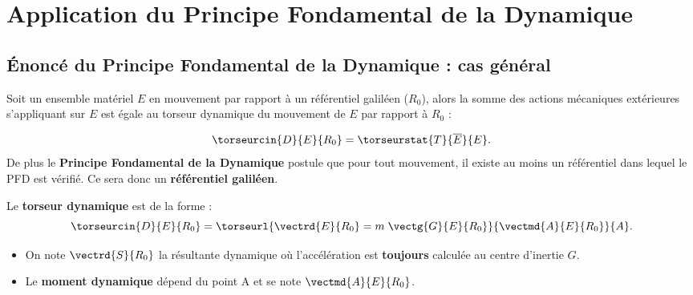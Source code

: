 \setchapterpreamble[u]{\margintoc}

\chapter{Application du Principe Fondamental de la Dynamique}



%




\section{Énoncé du Principe Fondamental de la Dynamique : cas général}

\begin{defi}
Soit un ensemble matériel $E$ en mouvement par rapport à un référentiel galiléen ($R_0$), alors la somme des actions mécaniques extérieures s'appliquant sur $E$ est égale au torseur dynamique du mouvement de $E$ par rapport à $R_0$ :

$$
\torseurcin{D}{E}{R_0}=\torseurstat{T}{\overline{E}}{E}.
$$
De plus le \textbf{Principe Fondamental de la Dynamique} postule que pour tout mouvement, il existe au moins un référentiel dans lequel le PFD est vérifié. Ce sera donc un \textbf{référentiel galiléen}.


Le \textbf{torseur dynamique} est de la forme : 
$$
\torseurcin{D}{E}{R_0}=\torseurl{
\vectrd{E}{R_0}=m\;\vectg{G}{E}{R_0}
}{
\vectmd{A}{E}{R_0}
}{A}.
$$


\begin{itemize}
\item On note $\vectrd{S}{R_0}$ la résultante dynamique où l'accélération est \textbf{toujours} calculée au centre d'inertie $G$.
\item Le \textbf{moment dynamique} dépend du point A et se note $\vectmd{A}{E}{R_0}$.
\end{itemize}


%



\end{defi}


